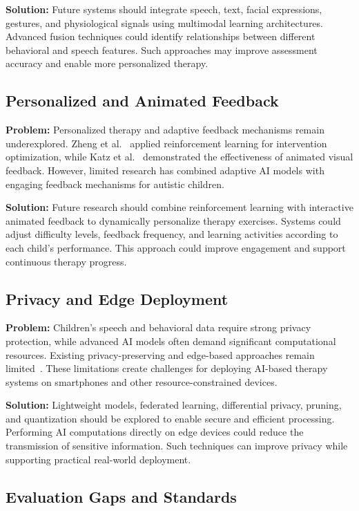 \documentclass[conference]{IEEEtran}
\begin{document}
\textbf{Solution:} Future systems should integrate speech, text, facial expressions, gestures, and physiological signals using multimodal learning architectures. Advanced fusion techniques could identify relationships between different behavioral and speech features. Such approaches may improve assessment accuracy and enable more personalized therapy.

\subsection{Personalized and Animated Feedback}

\textbf{Problem:} Personalized therapy and adaptive feedback mechanisms remain underexplored. Zheng et al.~\cite{ref11} applied reinforcement learning for intervention optimization, while Katz et al.~\cite{ref16} demonstrated the effectiveness of animated visual feedback. However, limited research has combined adaptive AI models with engaging feedback mechanisms for autistic children.

\textbf{Solution:} Future research should combine reinforcement learning with interactive animated feedback to dynamically personalize therapy exercises. Systems could adjust difficulty levels, feedback frequency, and learning activities according to each child's performance. This approach could improve engagement and support continuous therapy progress.

\subsection{Privacy and Edge Deployment}

\textbf{Problem:} Children's speech and behavioral data require strong privacy protection, while advanced AI models often demand significant computational resources. Existing privacy-preserving and edge-based approaches remain limited~\cite{ref23,ref24}. These limitations create challenges for deploying AI-based therapy systems on smartphones and other resource-constrained devices.

\textbf{Solution:} Lightweight models, federated learning, differential privacy, pruning, and quantization should be explored to enable secure and efficient processing. Performing AI computations directly on edge devices could reduce the transmission of sensitive information. Such techniques can improve privacy while supporting practical real-world deployment.

\subsection{Evaluation Gaps and Standards}
\end{document}
